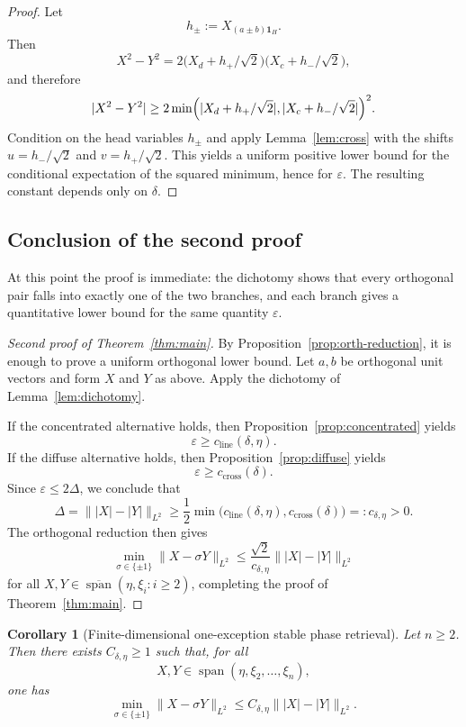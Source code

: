 \documentclass[11pt]{amsart}
\numberwithin{equation}{section}
\newtheorem{corollary}[theorem]{Corollary}
\theoremstyle{definition}
\theoremstyle{remark}
\newcommand{\Span}{\operatorname{span}}
\newcommand{\eps}{\varepsilon}
\newcommand{\abs}[1]{\lvert #1 \rvert}
\newcommand{\norm}[1]{\lVert #1 \rVert}
\begin{document}
\begin{proof}
Let
\[
h_\pm:=X_{(a\pm b)\mathbf 1_H}.
\]
Then
\[
X^2-Y^2
=2\bigl(X_d+h_+/\sqrt2\bigr)\bigl(X_c+h_-/\sqrt2\bigr),
\]
and therefore
\[
\abs{X^2-Y^2}
\ge
2\min\Bigl(\abs{X_d+h_+/\sqrt2},\abs{X_c+h_-/\sqrt2}\Bigr)^2.
\]
Condition on the head variables $h_\pm$ and apply Lemma~\ref{lem:cross} with
the shifts $u=h_-/\sqrt2$ and $v=h_+/\sqrt2$.  This yields a uniform positive
lower bound for the conditional expectation of the squared minimum, hence for
$\eps$.  The resulting constant depends only on $\delta$.
\end{proof}

\subsection{Conclusion of the second proof}

At this point the proof is immediate: the dichotomy shows that every
orthogonal pair falls into exactly one of the two branches, and each branch
gives a quantitative lower bound for the same quantity $\eps$.

\begin{proof}[Second proof of Theorem~\ref{thm:main}]
By Proposition~\ref{prop:orth-reduction}, it is enough to prove a uniform
orthogonal lower bound.  Let $a,b$ be orthogonal unit vectors and form $X$
and $Y$ as above.  Apply the dichotomy of Lemma~\ref{lem:dichotomy}.

If the concentrated alternative holds, then
Proposition~\ref{prop:concentrated} yields
\[
\eps\ge c_{\mathrm{line}}(\delta,\eta).
\]
If the diffuse alternative holds, then Proposition~\ref{prop:diffuse} yields
\[
\eps\ge c_{\mathrm{cross}}(\delta).
\]
Since $\eps\le 2\Delta$, we conclude that
\[
\Delta
=\norm{|X|-|Y|}_{L^2}
\ge
\frac12\min\bigl(c_{\mathrm{line}}(\delta,\eta),c_{\mathrm{cross}}(\delta)\bigr)
=:c_{\delta,\eta}>0.
\]
The orthogonal reduction then gives
\[
\min_{\sigma\in\{\pm1\}}\norm{X-\sigma Y}_{L^2}
\le \frac{\sqrt2}{c_{\delta,\eta}}\norm{|X|-|Y|}_{L^2}
\]
for all $X,Y\in \overline{\Span}(\eta,\xi_i:i\ge2)$, completing the proof of
Theorem~\ref{thm:main}.
\end{proof}

\begin{corollary}[Finite-dimensional one-exception stable phase retrieval]
\label{cor:finite-one-exception}
Let $n\ge2$.  Then there exists $C_{\delta,\eta}\ge1$ such that, for all
\[
X,Y\in \Span(\eta,\xi_2,\dots,\xi_n),
\]
one has
\[
\min_{\sigma\in\{\pm1\}}\norm{X-\sigma Y}_{L^2}
\le
C_{\delta,\eta}\norm{|X|-|Y|}_{L^2}.
\]
\end{corollary}
\end{document}
